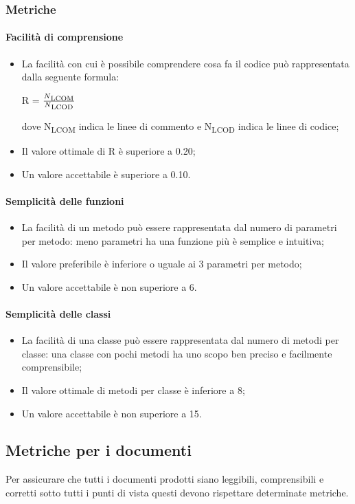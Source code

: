 		\subsubsection{Metriche}
			\paragraph{Facilità di comprensione}
			\begin{itemize}
			\item La facilità con cui è possibile comprendere cosa fa il codice può rappresentata dalla seguente formula: \\
			\centerline{R = \(\frac{N\textsubscript{LCOM}}{N\textsubscript{LCOD}} \) }
			dove N\textsubscript{LCOM} indica le linee di commento e N\textsubscript{LCOD} indica le linee di codice;
			\item Il valore ottimale di R è superiore a 0.20;
			\item Un  valore accettabile è superiore a 0.10.
			\end{itemize}
			\paragraph{Semplicità delle funzioni}
			\begin{itemize}
			\item La facilità di un metodo può essere rappresentata dal numero di parametri per metodo: meno parametri ha una funzione più è semplice e intuitiva;
			\item Il valore preferibile è inferiore o uguale ai 3 parametri per metodo;
			\item Un valore accettabile  è non superiore a 6.
			\end{itemize}
			\paragraph{Semplicità delle classi}
			\begin{itemize}
			\item La facilità di una classe può essere rappresentata dal numero di metodi per classe: una classe con pochi metodi ha uno scopo ben preciso e facilmente comprensibile;
			\item Il valore ottimale di metodi per classe è inferiore a 8;
			\item Un valore accettabile è non superiore a 15.
			\end{itemize}
\pagebreak
	\subsection{Metriche per i documenti}
	Per assicurare che tutti i documenti prodotti siano leggibili, comprensibili e corretti sotto tutti i punti di vista questi devono rispettare determinate metriche.
